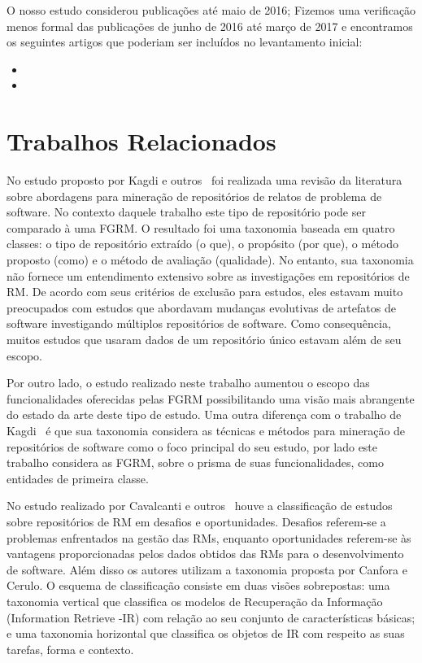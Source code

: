 O nosso estudo considerou publicações até maio de 2016; Fizemos uma verificação
menos formal das publicações de junho de 2016 até março de 2017 e encontramos os
seguintes artigos que poderiam ser incluídos no levantamento inicial:

\begin{itemize}
	\item 
	\item
\end{itemize}

\section{Trabalhos Relacionados}
\label{sec:map_trabalhos_relacionados}

No estudo proposto por Kagdi e outros~\cite{kagdi2012assigning} foi realizada
uma revisão da literatura sobre abordagens para mi\-ne\-ra\-ção de repositórios de
relatos de problema de software. No contexto daquele trabalho este tipo de
repositório pode ser comparado à uma FGRM\@. O resultado foi uma taxonomia
baseada em quatro classes: o tipo de repositório extraído (o que), o propósito
(por que), o método proposto (como) e o método de avaliação (qualidade). No
entanto, sua taxonomia não fornece um entendimento extensivo sobre as
investigações em repositórios de RM\@. De acordo com seus critérios de exclusão
para estudos, eles estavam muito preocupados com estudos que abordavam mudanças
evolutivas de artefatos de software investigando múltiplos repositórios de
software. Como consequência, muitos estudos que usaram dados de um repositório
único estavam além de seu escopo.

Por outro lado, o estudo realizado neste trabalho aumentou o escopo das
funcionalidades oferecidas pelas FGRM possibilitando uma visão mais abrangente
do estado da arte deste tipo de estudo. Uma outra diferença com o trabalho de
Kagdi~\cite{kagdi2012assigning} é que sua taxonomia considera as técnicas e
métodos para mineração de repositórios de software como o foco principal do seu
estudo, por lado este trabalho considera as FGRM, sobre o prisma de suas
funcionalidades, como entidades de primeira classe.

No estudo realizado por Cavalcanti e outros~\cite{cavalcanti2014challenges}
houve a classificação de estudos sobre repositórios de RM em desafios e
oportunidades. Desafios referem-se a problemas enfrentados na gestão das RMs,
enquanto oportunidades referem-se às vantagens proporcionadas pelos dados
obtidos das  RMs para o desenvolvimento de software. Além disso os autores
utilizam a taxonomia proposta por Canfora e Cerulo\cite{cerulo2004taxonomy}. O
esquema de classificação consiste em duas visões sobrepostas: uma taxonomia
vertical que classifica os modelos de Recuperação da Informação (Information
Retrieve \@-\@ IR) com relação ao seu conjunto de características básicas; e uma
taxonomia horizontal que classifica os objetos de IR com respeito as suas
tarefas, forma e contexto.

